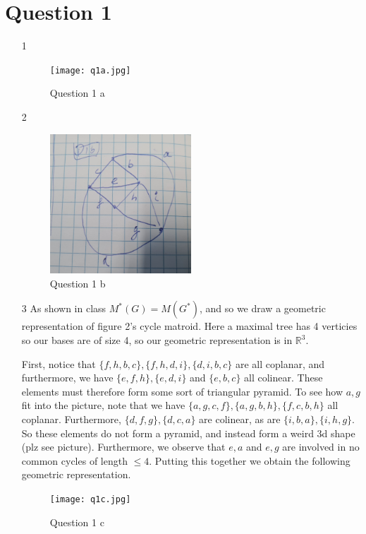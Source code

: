 \documentclass{article}
\author{Ben Shirley}
\begin{document}
\section*{Question 1}
\begin{enumerate}
    \item[1]
        \begin{figure}[!htb]
            \centering
            \texttt{[image: q1a.jpg]}
            \caption{Question 1 a}
        \end{figure}
    \item[2]
        \begin{figure}[!htb]
            \centering
            \includegraphics[width=0.5\textwidth]{q1b.jpg}
            \caption{Question 1 b}
        \end{figure}
    \item[3] As shown in class $M^*(G)=M(G^*)$,
        and so we draw a geometric representation of figure 2's 
        cycle matroid. Here a maximal tree has 4 verticies so 
        our bases are of size 4, so our geometric representation is in $\mathbb{R}^3$.

        First, notice that $\{f, h, b, c\}, \{f, h, d, i\}, \{d, i, b, c\}$ are all coplanar, and furthermore, we have $\{e, f, h\}, \{e, d, i\}$ 
        and $\{e, b, c\}$ all colinear. These elements must therefore form some sort of triangular pyramid.
        To see how $a, g$ fit into the picture, note that we have $\{a, g, c, f\}, \{a, g, b, h\}, \{f, c, b, h\}$ all coplanar.
        Furthermore, $\{d, f, g\}, \{d,c,a\}$ are colinear, as are $\{i, b, a\}, \{i, h, g\}$. So these elements do not form a pyramid,
        and instead form a weird 3d shape (plz see picture).
        Furthermore, we observe that $e, a$ and $e, g$ are involved in no common cycles of length $\le 4$. Putting this together we obtain the 
        following geometric representation.
        \begin{figure}
            \centering
            \texttt{[image: q1c.jpg]}
            \caption{Question 1 c}
        \end{figure}
        
\end{enumerate}
\end{document}
